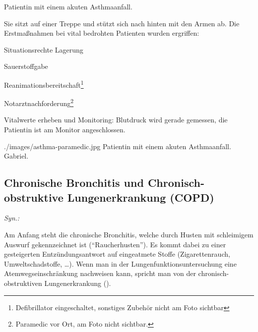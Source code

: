 {
Patientin mit einem akuten Asthmaanfall.

Sie sitzt auf einer Treppe und stützt sich nach hinten
mit den Armen ab. Die Erstmaßnahmen bei vital bedrohten Patienten wurden ergriffen:
\begin{compactitem}
  \item Situationsrechte Lagerung
  \item Sauerstoffgabe
  \item Reanimationsbereitschaft\footnote{Defibrillator eingeschaltet,
  sonstiges Zubehör nicht am Foto sichtbar}
  \item Notarztnachforderung\footnote{Paramedic
  vor Ort, am Foto nicht sichtbar.}
  \item Vitalwerte erheben und Monitoring:
  Blutdruck wird gerade gemessen, die Patientin
  ist am Monitor angeschlossen.
\end{compactitem}
}{

}
{./images/asthma-paramedic.jpg}
{Patientin mit einem akuten Asthmaanfall.\label{fig:asthma-paramedic}}
{Gabriel.}





\subsection{Chronische Bronchitis und 
Chronisch-obstruktive Lungenerkrankung
(COPD)}
\label{topic:copd}
\nocite{Renz-Polster2006} 


\emph{Syn.: }


Am Anfang steht die chronische Bronchitis, welche durch
Husten mit schleimigem Auswurf gekennzeichnet ist
("`Raucherhusten"'). Es kommt dabei zu einer gesteigerten
Entzündungsantwort auf eingeatmete Stoffe (Zigarettenrauch,
Umweltschadstoffe, \ldots). Wenn man in der
Lungenfunktionsuntersuchung eine Atemwegseinschränkung
nachweisen kann, spricht man von der chronisch-obstruktiven
Lungenerkrankung (). 



